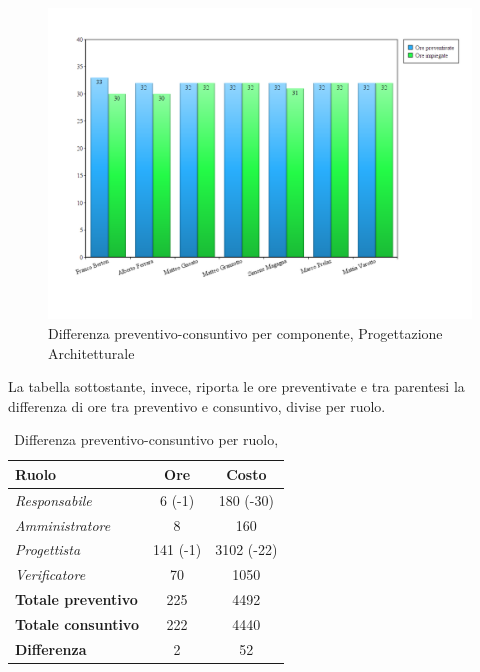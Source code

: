 \begin{figure}[H]
	\centering
	\includegraphics[scale=0.4]{immagini/Grafi/ProgettazioneArchitetturale_oreComponente.png}
	\caption{Differenza preventivo-consuntivo per componente, Progettazione Architetturale}
\end{figure}
\FloatBarrier

\newpage
La tabella sottostante, invece, riporta le ore preventivate e  tra parentesi la differenza di ore tra preventivo e consuntivo, divise per ruolo.

\begin{table}[H]
	\begin{center}
		\begin{tabular}{|l|c|c|}
			\hline
			\textbf{Ruolo}	& \textbf{Ore} & \textbf{Costo} \\
			\hline
			\textit{Responsabile}		&	6 (-1)	&	180 (-30) 	\\
			\hline
			\textit{Amministratore}		&	8		&	160			\\
			\hline
			\textit{Progettista}		&	141 (-1)&	3102 (-22) 	\\
			\hline
			\textit{Verificatore}		&	70 		&	1050 		\\
			\hline
			\textbf{Totale preventivo}	&	225		& 	4492		\\
			\hline
			\textbf{Totale consuntivo}	&	222		&  	4440		\\
			\hline
			\textbf{Differenza} 		&	2		&	52			\\
			\hline
		\end{tabular}
	\end{center}
	\caption{Differenza preventivo-consuntivo per ruolo, \PA}
\end{table}

